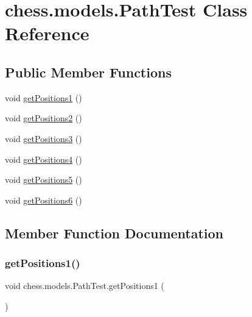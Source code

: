 \hypertarget{classchess_1_1models_1_1_path_test}{}\section{chess.\+models.\+Path\+Test Class Reference}
\label{classchess_1_1models_1_1_path_test}
\subsection*{Public Member Functions}
\begin{DoxyCompactItemize}
\item 
void \mbox{\hyperlink{classchess_1_1models_1_1_path_test_af8658336e6ffed8c20de620ad12a37e3}{get\+Positions1}} ()
\item 
void \mbox{\hyperlink{classchess_1_1models_1_1_path_test_a572cc15adf7eb579533b04040f14fc41}{get\+Positions2}} ()
\item 
void \mbox{\hyperlink{classchess_1_1models_1_1_path_test_a42e6278bdbd086dbb1394c8bf873a0af}{get\+Positions3}} ()
\item 
void \mbox{\hyperlink{classchess_1_1models_1_1_path_test_aaf6c6d5aa808f5053969af5aab3a445e}{get\+Positions4}} ()
\item 
void \mbox{\hyperlink{classchess_1_1models_1_1_path_test_aa34d58c5b3a3227dc5149a288c804703}{get\+Positions5}} ()
\item 
void \mbox{\hyperlink{classchess_1_1models_1_1_path_test_a3dd398e0f0b6122db0ab49e67e1182b0}{get\+Positions6}} ()
\end{DoxyCompactItemize}


\subsection{Member Function Documentation}
\mbox{\label{classchess_1_1models_1_1_path_test_af8658336e6ffed8c20de620ad12a37e3}} 
\subsubsection{\texorpdfstring{get\+Positions1()}{getPositions1()}}
{\footnotesize\ttfamily void chess.\+models.\+Path\+Test.\+get\+Positions1 (\begin{DoxyParamCaption}{ }\end{DoxyParamCaption})}


